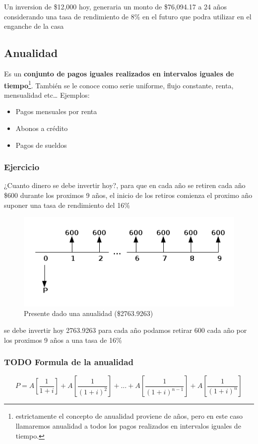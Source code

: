\documentclass[11pt]{article}
\begin{document}
Un inversion de \$12,000 hoy, generaria un monto de \$76,094.17 a 24 años considerando una tasa de rendimiento de 8\% en el futuro que podra utilizar en el enganche de la casa

\subsection*{Anualidad}
\label{sec:org7b989d0}
Es un \textbf{conjunto de pagos iguales realizados en intervalos iguales de tiempo}\footnote{estrictamente el concepto de anualidad proviene de años, pero en este caso llamaremos anualidad a todos los pagos realizados en intervalos iguales de tiempo.}. También se le conoce como serie uniforme, flujo constante, renta, mensualidad etc\ldots{} Ejemplos:

\begin{itemize}
\item Pagos mensuales por renta
\item Abonos a crédito
\item Pagos de sueldos
\end{itemize}

\subsubsection*{Ejercicio}
\label{sec:org88cb104}
¿Cuanto dinero se debe invertir hoy?, para que en cada año se retiren cada año \$600 durante los proximos 9 años, el inicio de los retiros comienza el proximo año suponer una tasa de rendimiento del 16\%

\begin{figure}[htbp]
\centering
\includegraphics[width=.9\linewidth]{img/anualidad_1.png}
\caption{Presente dado una anualidad (\$2763.9263)}
\end{figure}

se debe invertir hoy 2763.9263 para cada año podamos retirar 600 cada año por los proximos 9 años a una tasa de 16\%

\subsubsection*{{\bfseries\sffamily TODO} Formula de la anualidad}
\label{sec:org514c862}
\[
 P = A\left[ \frac{1}{1+i} \right] + 
     A\left[ \frac{1}{(1+i)^2} \right] + 
     ... +
     A\left[ \frac{1}{(1+i)^{n-1}} \right] + 
     A\left[ \frac{1}{(1+i)^{n}} \right]  
\]
\end{document}
